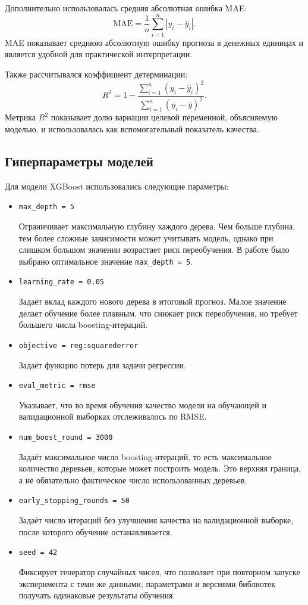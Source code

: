 \documentclass[12pt,a4paper]{article}
\newcommand{\feat}[1]{\path{#1}}
\numberwithin{equation}{section}
\begin{document}
Дополнительно использовалась средняя абсолютная ошибка MAE:
\[
\mathrm{MAE} = \frac{1}{n}\sum_{i=1}^{n}|y_i - \hat{y}_i|.
\]
MAE показывает среднюю абсолютную ошибку прогноза в денежных единицах и является удобной для практической интерпретации.

Также рассчитывался коэффициент детерминации:
\[
R^2 = 1 - \frac{\sum_{i=1}^{n}(y_i - \hat{y}_i)^2}{\sum_{i=1}^{n}(y_i - \bar{y})^2}.
\]
Метрика \(R^2\) показывает долю вариации целевой переменной, объясняемую моделью, и использовалась как вспомогательный показатель качества.

\subsection{Гиперпараметры моделей}

Для модели XGBoost использовались следующие параметры:
\begin{itemize}
    \item \texttt{max\_depth = 5}

    Ограничивает максимальную глубину каждого дерева. Чем больше глубина, тем более сложные зависимости может учитывать модель, однако при слишком большом значении возрастает риск переобучения. В работе было выбрано оптимальное значение \texttt{max\_depth = 5}.
    \item \texttt{learning\_rate = 0.05}

    Задаёт вклад каждого нового дерева в итоговый прогноз. Малое значение \feat{learning_rate} делает обучение более плавным, что снижает риск переобучения, но требует большего числа boosting-итераций.
    \item \texttt{objective = reg:squarederror}

    Задаёт функцию потерь для задачи регрессии.
    \item \texttt{eval\_metric = rmse}

    Указывает, что во время обучения качество модели на обучающей и валидационной выборках отслеживалось по RMSE.
    \item \texttt{num\_boost\_round = 3000}

    Задаёт максимальное число boosting-итераций, то есть максимальное количество деревьев, которые может построить модель. Это верхняя граница, а не обязательно фактическое число использованных деревьев.
    \item \texttt{early\_stopping\_rounds = 50}

    Задаёт число итераций без улучшения качества на валидационной выборке, после которого обучение останавливается.
    \item \texttt{seed = 42}

    Фиксирует генератор случайных чисел, что позволяет при повторном запуске эксперимента с теми же данными, параметрами и версиями библиотек получать одинаковые результаты обучения.
\end{itemize}
\end{document}
